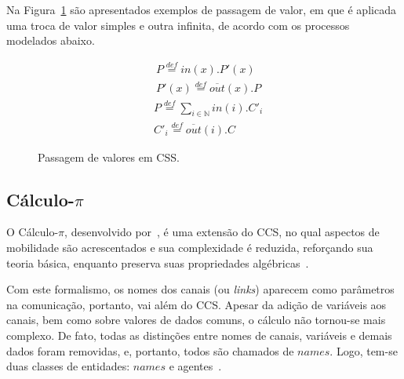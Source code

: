 Na Figura~\ref{fig:ccs_value} são apresentados exemplos de passagem de valor, em que é aplicada uma troca de valor simples e outra infinita, de acordo com os processos modelados abaixo.

\begin{align}
&P \stackrel{def}{=} in(x).P'(x) \nonumber \\
&P'(x) \stackrel{def}{=} \overline{out}(x).P
\end{align}
\begin{align}
&P \stackrel{def}{=} \sum_{i \in \mathbb{N}} in(i).C'_{i} \nonumber \\
&C'_{i} \stackrel{def}{=} \overline{out}(i).C
\end{align}

\begin{figure}[ht]
	\centering
{}
	\caption{Passagem de valores em CSS.
		\label{fig:ccs_value}}
\end{figure}
\FloatBarrier 

\subsection{Cálculo-$\pi$}

O Cálculo-$\pi$, desenvolvido por~\citeauthor{milner1992calculus}, é uma extensão do CCS, no qual aspectos de mobilidade são acrescentados e sua complexidade é reduzida, reforçando sua teoria básica, enquanto preserva suas propriedades algébricas~\cite{milner1992calculus}.

Com este formalismo, os nomes dos canais (ou \textit{links}) aparecem como parâmetros na comunicação, portanto, vai além do CCS. Apesar da adição de variáveis aos canais, bem como sobre valores de dados comuns, o cálculo não tornou-se mais complexo. De fato, todas as distinções entre nomes de canais, variáveis e demais dados foram removidas, e, portanto, todos são chamados de $names$. Logo, tem-se duas classes de entidades: $names$ e agentes~\cite{milner1992calculus}.

